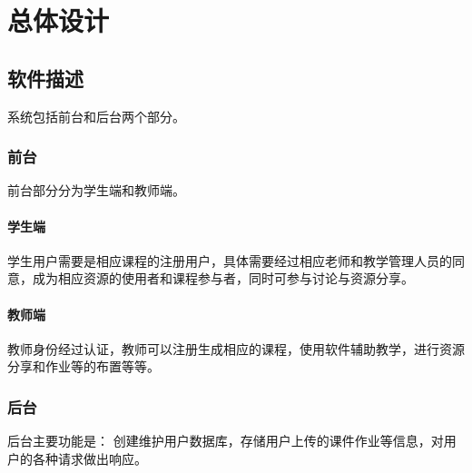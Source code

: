 \chapter{总体设计}
\section{软件描述}
系统包括前台和后台两个部分。

\subsection{前台}
前台部分分为学生端和教师端。
\subsubsection{学生端}
学生用户需要是相应课程的注册用户，具体需要经过相应老师和教学管理人员的同意，成为相应资源的使用者和课程参与者，同时可参与讨论与资源分享。

\subsubsection{教师端}
教师身份经过认证，教师可以注册生成相应的课程，使用软件辅助教学，进行资源分享和作业等的布置等等。

\subsection{后台}
后台主要功能是：
创建维护用户数据库，存储用户上传的课件作业等信息，对用户的各种请求做出响应。

